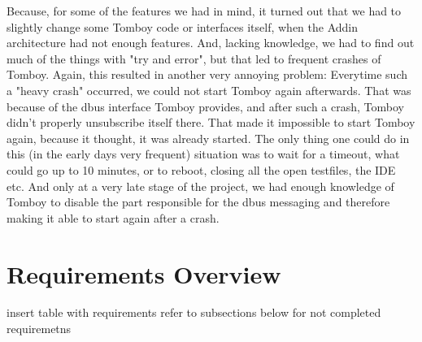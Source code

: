 \documentclass[11pt,a4paper,titlepage]{article}
\begin{document}
Because, for some of the features we had in mind, it turned out that we had to slightly change some Tomboy code or interfaces itself, when the Addin architecture had not enough features. And, lacking knowledge, we had to find out much of the things with "try and error", but that led to frequent crashes of Tomboy. Again, this resulted in another very annoying problem: Everytime such a "heavy crash" occurred, we could not start Tomboy again afterwards. That was because of the dbus interface Tomboy provides, and after such a crash, Tomboy didn't properly unsubscribe itself there. That made it impossible to start Tomboy again, because it thought, it was already started. The only thing one could do in this (in the early days very frequent) situation was to wait for a timeout, what could go up to 10 minutes, or to reboot, closing all the open testfiles, the IDE etc. And only at a very late stage of the project, we had enough knowledge of Tomboy to disable the part responsible for the dbus messaging and therefore making it able to start again after a crash.


\section{Requirements Overview}
insert table with requirements refer to subsections below for not completed requiremetns
\end{document}
